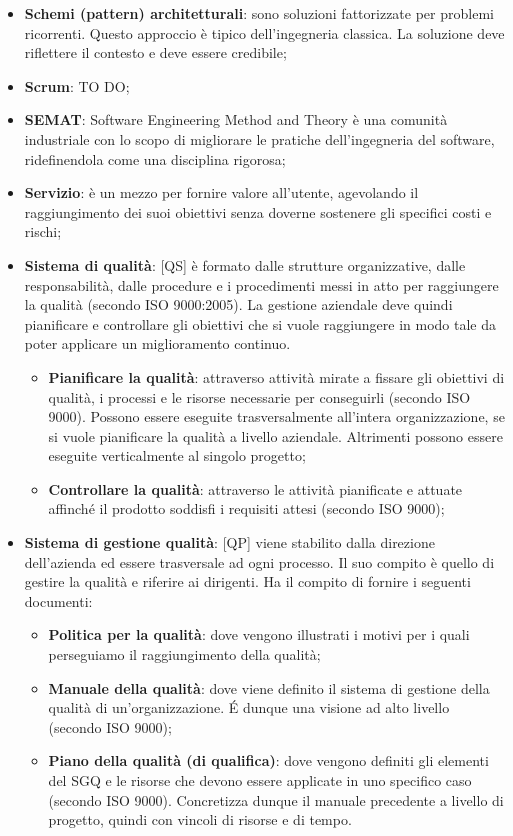 \begin{itemize}
	\item \textbf{Schemi (pattern) architetturali}: sono soluzioni fattorizzate per problemi ricorrenti. Questo approccio è tipico dell'ingegneria classica. La soluzione deve riflettere il contesto e deve essere credibile;

	\item \textbf{Scrum}: TO DO;

	\item \textbf{SEMAT}: Software Engineering Method and Theory è una comunità industriale con lo scopo di migliorare le pratiche dell'ingegneria del software, ridefinendola come una disciplina rigorosa;

	\item \textbf{Servizio}: è un mezzo per fornire valore all'utente, agevolando il raggiungimento dei suoi obiettivi senza doverne sostenere gli specifici costi e rischi;
	\item \textbf{Sistema di qualità}: [QS] è formato dalle strutture organizzative, dalle responsabilità, dalle procedure e i procedimenti messi in atto per raggiungere la qualità (secondo ISO 9000:2005). La gestione aziendale deve quindi pianificare e controllare gli obiettivi che si vuole raggiungere in modo tale da poter applicare un miglioramento continuo.
		\begin{itemize}
			\item \textbf{Pianificare la qualità}: attraverso attività mirate a fissare gli obiettivi di qualità, i processi e le risorse necessarie per conseguirli (secondo ISO 9000). Possono essere eseguite trasversalmente all'intera organizzazione, se si vuole pianificare la qualità a livello aziendale. Altrimenti possono essere eseguite verticalmente al singolo progetto;
			\item \textbf{Controllare la qualità}: attraverso le attività pianificate e attuate affinché il prodotto soddisfi i requisiti attesi (secondo ISO 9000);
		\end{itemize}

	\item \textbf{Sistema di gestione qualità}: [QP] viene stabilito dalla direzione dell'azienda ed essere trasversale ad ogni processo. Il suo compito è quello di gestire la qualità e riferire ai dirigenti. Ha il compito di fornire i seguenti documenti:
		\begin{itemize}
			\item \textbf{Politica per la qualità}: dove vengono illustrati i motivi per i quali perseguiamo il raggiungimento della qualità;
			\item \textbf{Manuale della qualità}: dove viene definito il sistema di gestione della qualità di un'organizzazione. \'E dunque una visione ad alto livello (secondo ISO 9000);
			\item \textbf{Piano della qualità (di qualifica)}: dove vengono definiti gli elementi del SGQ e le risorse che devono essere applicate in uno specifico caso (secondo ISO 9000). Concretizza dunque il manuale precedente a livello di progetto, quindi con vincoli di risorse e di tempo.
		\end{itemize}


\end{itemize}
